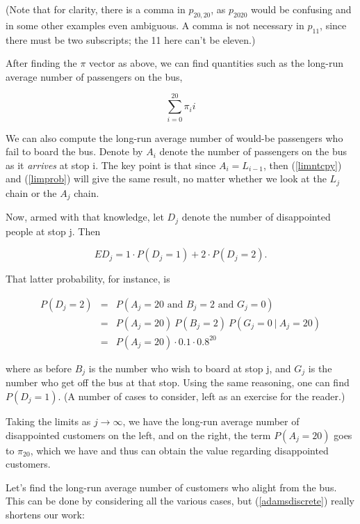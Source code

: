 (Note that for clarity, there is a comma in $p_{20,20}$, as $p_{2020}$
would be confusing and in some other examples even ambiguous.  A comma
is not necessary in $p_{11}$, since there must be two subscripts; the 11
here can't be eleven.)

After finding the $\pi$ vector as above, we can find quantities such as
the long-run average number of passengers on the bus,

\begin{equation}
\label{avgonbus}
\sum_{i=0}^{20} \pi_i i
\end{equation}

We can also compute the long-run average number of would-be passengers who
fail to board the bus.  Denote by $A_i$ denote the number of passengers
on the bus as it {\it arrives} at stop i. The key point is that since
$A_i = L_{i-1}$, then (\ref{limntcpy}) and (\ref{limprob}) will give the
same result, no matter whether we look at the $L_j$ chain or the $A_j$ chain.

Now, armed with that knowledge, let $D_j$ denote the number of
disappointed people at stop j.  Then

\begin{equation}
ED_j = 1 \cdot P(D_j = 1) + 2 \cdot P(D_j = 2).
\end{equation}

That latter probability, for instance, is

\begin{eqnarray}
P(D_j = 2) 
&=& 
P(A_j = 20 \textrm{ and } B_j = 2 \textrm{ and } G_j = 0) \\ 
&=& P(A_j = 20) ~ P(B_j = 2) ~ P(G_j = 0 ~|~ A_j = 20) \\
&=& P(A_j = 20) \cdot 0.1 \cdot 0.8^{20}
\end{eqnarray}

where as before $B_j$ is the number who wish to board at stop j, and
$G_j$ is the number who get off the bus at that stop.  Using the same
reasoning, one can find $P(D_j = 1)$. (A number of cases to consider,
left as an exercise for the reader.)

Taking the limits as $j \rightarrow \infty$, we have the long-run
average number of disappointed customers on the left, and on the right,
the term $P(A_j = 20)$ goes to $\pi_{20}$, which we have and thus can
obtain the value regarding disappointed customers.

Let's find the long-run average number of customers who alight from the
bus.  This can be done by considering all the various cases, but
(\ref{adamsdiscrete}) really shortens our work:  

